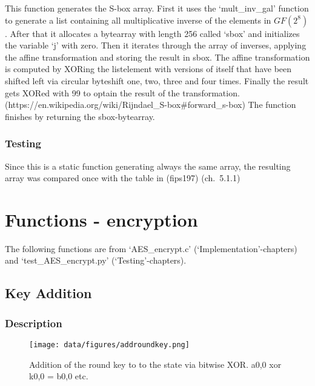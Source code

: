 This function generates the S-box array. First it uses the
`mult\_inv\_gal' function to generate a list containing all
multiplicative inverse of the elements in $GF(2^{8})$. After that it
allocates a bytearray with length 256 called `sbox' and initializes the
variable `j' with zero. Then it iterates through the array of inverses,
applying the affine transformation and storing the result in sbox. The
affine transformation is computed by XORing the listelement with
versions of itself that have been shifted left via circular byteshift
one, two, three and four times. Finally the result gets XORed with 99 to
optain the result of the transformation.
(https://en.wikipedia.org/wiki/Rijndael\_S-box\#forward\_s-box) The
function finishes by returning the sbox-bytearray.

\hypertarget{testing-1}{%
\subsubsection{Testing}\label{testing-1}}

Since this is a static function generating always the same array, the
resulting array was compared once with the table in (fips197)
(ch.~5.1.1)

\hypertarget{functions---encryption}{%
\section{Functions - encryption}\label{functions---encryption}}

The following functions are from `AES\_encrypt.c'
(`Implementation'-chapters) and `test\_AES\_encrypt.py'
(`Testing'-chapters).

\hypertarget{key-addition}{%
\subsection{Key Addition}\label{key-addition}}

\hypertarget{description-2}{%
\subsubsection{Description}\label{description-2}}

\begin{figure}
\centering
\texttt{[image: data/figures/addroundkey.png]} 
\caption{Addition of the round key to to the state via bitwise XOR. a0,0 xor k0,0 = b0,0 etc.}
\end{figure}

